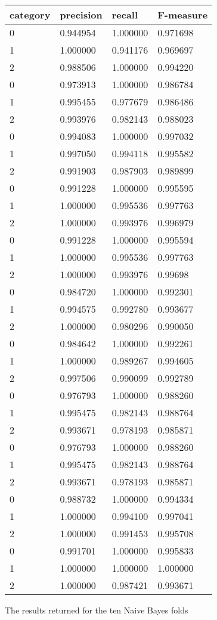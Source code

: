 \documentclass[
10pt, %
a4paper, %
oneside, %
headinclude,footinclude, %
] {book}%
\begin{document}
\begin{figure}[h]
\begin{tabular}{llll}
	category & precision & recall & F-measure \\
	\hline
	0 & 0.944954 & 1.000000 & 0.971698 \\
	1 & 1.000000 & 0.941176 & 0.969697 \\
	2 & 0.988506 & 1.000000 & 0.994220 \\
	\hline
	0 & 0.973913 & 1.000000 & 0.986784 \\
	1 & 0.995455 & 0.977679 & 0.986486 \\
	2 & 0.993976 & 0.982143 & 0.988023 \\
	\hline
	0 & 0.994083 & 1.000000 & 0.997032 \\
	1 & 0.997050 & 0.994118 & 0.995582 \\
	2 & 0.991903 & 0.987903 & 0.989899 \\
	\hline
	0 & 0.991228 & 1.000000 & 0.995595 \\
	1 & 1.000000 & 0.995536 & 0.997763 \\
	2 & 1.000000 & 0.993976 & 0.996979 \\
	\hline
	0 & 0.991228 & 1.000000 & 0.995594 \\
	1 & 1.000000 & 0.995536 & 0.997763 \\
	2 & 1.000000 & 0.993976 & 0.99698 \\
	\hline
	0 & 0.984720 & 1.000000 & 0.992301 \\
	1 & 0.994575 & 0.992780 & 0.993677 \\
	2 & 1.000000 & 0.980296 & 0.990050 \\
	\hline
	0 & 0.984642 & 1.000000 & 0.992261 \\
	1 & 1.000000 & 0.989267 & 0.994605 \\
	2 & 0.997506 & 0.990099 & 0.992789 \\
	\hline
	0 & 0.976793 & 1.000000 & 0.988260 \\
	1 & 0.995475 & 0.982143 & 0.988764 \\
	2 & 0.993671 & 0.978193 & 0.985871 \\
	\hline
	0 & 0.976793 & 1.000000 & 0.988260 \\
	1 & 0.995475 & 0.982143 & 0.988764 \\
	2 & 0.993671 & 0.978193 & 0.985871 \\
	\hline
	0 & 0.988732 & 1.000000 & 0.994334 \\
	1 & 1.000000 & 0.994100 & 0.997041 \\
	2 & 1.000000 & 0.991453 & 0.995708 \\
	\hline
	0 & 0.991701 & 1.000000 & 0.995833 \\
	1 & 1.000000 & 1.000000 & 1.000000 \\
	2 & 1.000000 & 0.987421 & 0.993671 \\
	\hline




\end{tabular}
	\caption{The results returned for the ten Naive Bayes folds}
\end{figure}
\end{document}
